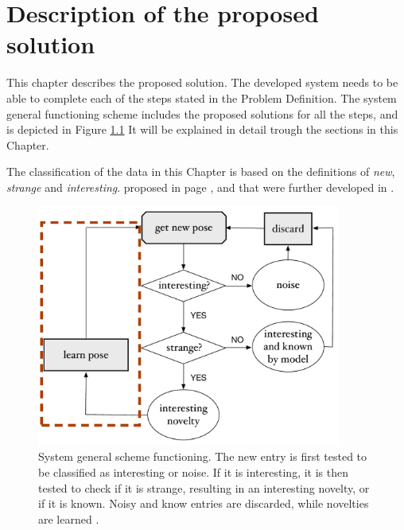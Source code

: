 
\chapter{Description of the proposed solution} %

\label{Chapter3} %



This chapter describes the proposed solution. The developed system needs to be able to complete each of the steps stated in the Problem Definition. The system general functioning scheme includes the proposed solutions for all the steps, and is depicted in Figure \ref{fig:scheme}  It will be explained in detail trough the sections in this Chapter. 

The classification of the data in this Chapter is based on the definitions of \emph{new}, \emph{strange} and \emph{interesting}. proposed in page \pageref{definitions}, and that were further developed in \pageref{new}.

\begin{figure}[h]
\includegraphics[width=10cm]{Figures/Esquema}
\centering
\caption[System general scheme functioning.]{System general scheme functioning. The new entry is first tested to be classified as interesting or noise. If it is interesting, it is then tested to check if it is strange, resulting in an interesting novelty, or if it is known. Noisy and know entries are discarded, while novelties are learned \label{fig:scheme}.}
\end{figure}

